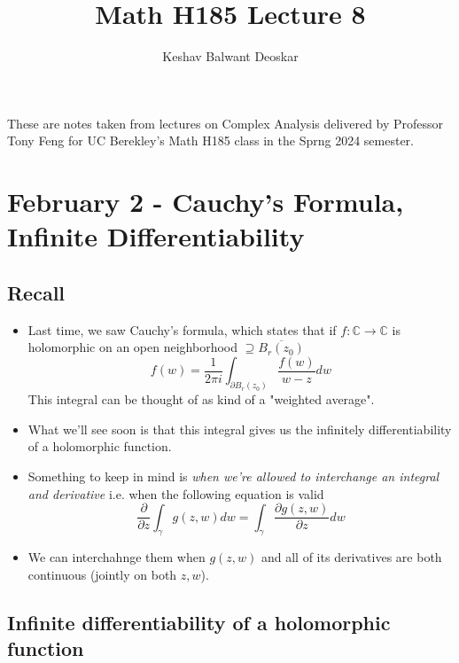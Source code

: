 \documentclass{article}
\title{Math H185 Lecture 8}
\author{Keshav Balwant Deoskar}
\newcommand{\C}{\mathbb{C}}
\begin{document}
\maketitle

These are notes taken from lectures on Complex Analysis delivered by Professor Tony Feng for UC Berekley's Math H185 class in the Sprng 2024 semester.

\tableofcontents

\pagebreak

\section{February 2 - Cauchy's Formula, Infinite Differentiability}

\vskip 0.5cm
\subsection*{Recall}

\vskip 0.5cm
\begin{itemize}
  \item Last time, we saw Cauchy's formula, which states that if $f : \C \rightarrow \C$ is holomorphic on an open neighborhood $\supseteq \overline{B_{r}(z_0)}$
  \[ f(w) = \frac{1}{2\pi i} \int_{\partial B_r(z_0)} \frac{f(w)}{w - z} dw \]
  This integral can be thought of as kind of a "weighted average".
  
  \item What we'll see soon is that this integral gives us the infinitely differentiability of a holomorphic function.
  
  \item Something to keep in mind is \emph{when we're allowed to interchange an integral and derivative} i.e. when the following equation is valid 
  \[ \frac{\partial}{\partial z} \int_{\gamma} g(z, w) dw = \int_{\gamma} \frac{\partial g(z, w)}{\partial z} dw \]
  \item We can interchahnge them when $g(z, w)$ and all of its derivatives are both continuous (jointly on both $z, w$).
\end{itemize}

\vskip 0.5cm
\subsection{Infinite differentiability of a holomorphic function}
\end{document}
